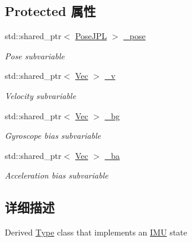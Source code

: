 \subsection*{Protected 属性}
\begin{DoxyCompactItemize}
\item 
\mbox{\label{classov__type_1_1IMU_ad90f5e8c1905d099de0ab908a072b112}} 
std\+::shared\+\_\+ptr$<$ \hyperlink{classov__type_1_1PoseJPL}{Pose\+J\+PL} $>$ \hyperlink{classov__type_1_1IMU_ad90f5e8c1905d099de0ab908a072b112}{\+\_\+pose}
\begin{DoxyCompactList}\small\item\em Pose subvariable \end{DoxyCompactList}\item 
\mbox{\label{classov__type_1_1IMU_ac1149c2a1b5576e56700ed2f7da3e87d}} 
std\+::shared\+\_\+ptr$<$ \hyperlink{classov__type_1_1Vec}{Vec} $>$ \hyperlink{classov__type_1_1IMU_ac1149c2a1b5576e56700ed2f7da3e87d}{\+\_\+v}
\begin{DoxyCompactList}\small\item\em Velocity subvariable \end{DoxyCompactList}\item 
\mbox{\label{classov__type_1_1IMU_ac3dac355b5fbcc80bc59ea05808dc2f8}} 
std\+::shared\+\_\+ptr$<$ \hyperlink{classov__type_1_1Vec}{Vec} $>$ \hyperlink{classov__type_1_1IMU_ac3dac355b5fbcc80bc59ea05808dc2f8}{\+\_\+bg}
\begin{DoxyCompactList}\small\item\em Gyroscope bias subvariable \end{DoxyCompactList}\item 
\mbox{\label{classov__type_1_1IMU_a5b2bc57054d02e37355f52799cc9df15}} 
std\+::shared\+\_\+ptr$<$ \hyperlink{classov__type_1_1Vec}{Vec} $>$ \hyperlink{classov__type_1_1IMU_a5b2bc57054d02e37355f52799cc9df15}{\+\_\+ba}
\begin{DoxyCompactList}\small\item\em Acceleration bias subvariable \end{DoxyCompactList}\end{DoxyCompactItemize}


\subsection{详细描述}
Derived \hyperlink{classov__type_1_1Type}{Type} class that implements an \hyperlink{classov__type_1_1IMU}{I\+MU} state 

